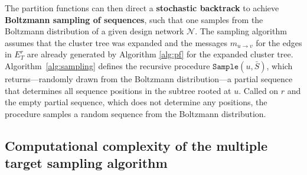 \documentclass{bioinfo}
\newcommand{\network}{\mathcal{N}}
\newcommand{\val}{\bar S} %
\newcommand{\partfun}[1]{Z_{#1}}
\newcommand{\Message}[2]{m_{#1\rightarrow #2}}
\newcommand{\F}{\mathcal{F}}
\newcommand{\sample}{\texttt{Sample}}
\newcommand{\edgesToR}{E^r_T}
\newcommand{\phitotal}{\phi_{\operatorname{m}}}
\newcommand{\Def}[1]{{\bfseries #1}}
\newcommand{\evalfor}[2]{#1\llbracket{}#2\rrbracket{}}
\newcommand{\substitute}[2]{#1\!\oplus\!#2}
\begin{document}
 \SetKwFunction{Sample}{$\sample$}


The partition functions can then direct a \Def{stochastic backtrack} to achieve \Def{Boltzmann sampling of sequences}, such that one samples from the Boltzmann distribution of a given design network $\network$. The sampling algorithm assumes that the cluster tree was expanded and the messages $\Message{u}{v}$ for the edges in $\edgesToR{}$ are already generated by Algorithm \ref{alg:pf} for the expanded cluster tree.
%
Algorithm~\ref{alg:sampling} defines the recursive procedure
$\sample(u,\val)$, which returns---randomly drawn from the
Boltzmann distribution---a partial sequence that determines all
sequence positions in the subtree rooted at $u$.  Called on $r$ and
the empty partial sequence, which does not determine any positions,
the procedure samples a random sequence from the Boltzmann
distribution.



\subsection{Computational complexity of the multiple target sampling algorithm}\label{sec:complexity}

\end{document}

